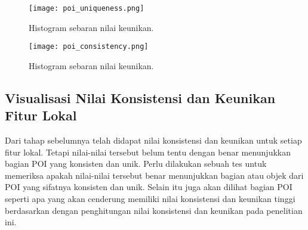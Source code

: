 \begin{figure}[H]
	\centering
	\texttt{[image: poi\_uniqueness.png]}
	\caption{Histogram sebaran nilai keunikan.}
	\label{fig:hist_other_uniqueness}
\end{figure}

\begin{figure}[H]
	\centering
	\texttt{[image: poi\_consistency.png]}
	\caption{Histogram sebaran nilai keunikan.}
	\label{fig:hist_other_consistency}
\end{figure}

\subsection{Visualisasi Nilai Konsistensi dan Keunikan Fitur Lokal}
Dari tahap sebelumnya telah didapat nilai konsistensi dan keunikan untuk setiap fitur lokal. Tetapi nilai-nilai tersebut belum tentu dengan benar menunjukkan bagian POI yang konsisten dan unik. Perlu dilakukan sebuah tes untuk memeriksa apakah nilai-nilai tersebut benar menunjukkan bagian atau objek dari POI yang sifatnya konsisten dan unik. Selain itu juga akan dilihat bagian POI seperti apa yang akan cenderung memiliki nilai konsistensi dan keunikan tinggi berdasarkan dengan penghitungan nilai konsistensi dan keunikan pada penelitian ini.


